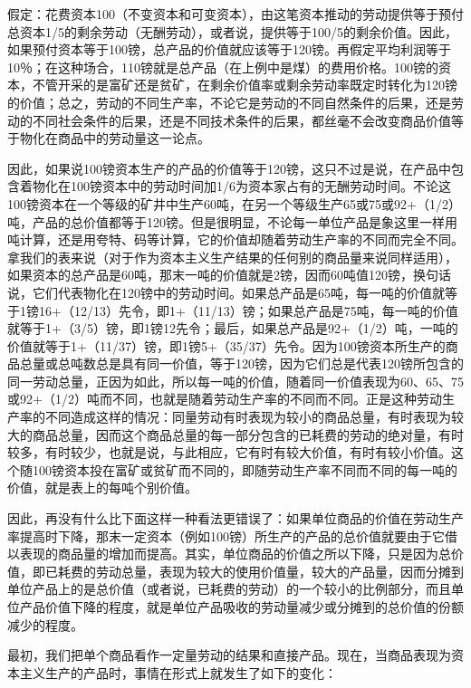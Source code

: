 
假定：花费资本100（不变资本和可变资本），由这笔资本推动的劳动提供等于预付总资本1/5的剩余劳动（无酬劳动），或者说，提供等于100/5的剩余价值。因此，如果预付资本等于100镑，总产品的价值就应该等于120镑。再假定平均利润等于10％；在这种场合，110镑就是总产品（在上例中是煤）的费用价格。100镑的资本，不管开采的是富矿还是贫矿，在剩余价值率或剩余劳动率既定时转化为120镑的价值；总之，劳动的不同生产率，不论它是劳动的不同自然条件的后果，还是劳动的不同社会条件的后果，还是不同技术条件的后果，都丝毫不会改变商品价值等于物化在商品中的劳动量这一论点。

因此，如果说100镑资本生产的产品的价值等于120镑，这只不过是说，在产品中包含着物化在100镑资本中的劳动时间加1/6为资本家占有的无酬劳动时间。不论这100镑资本在一个等级的矿井中生产60吨，在另一个等级生产65或75或92+（1/2）吨，产品的总价值都等于120镑。但是很明显，不论每一单位产品是象这里一样用吨计算，还是用夸特、码等计算，它的价值却随着劳动生产率的不同而完全不同。拿我们的表来说（对于作为资本主义生产结果的任何别的商品量来说同样适用），如果资本的总产品是60吨，那末一吨的价值就是2镑，因而60吨值120镑，换句话说，它们代表物化在120镑中的劳动时间。如果总产品是65吨，每一吨的价值就等于1镑16+（12/13）先令，即1+（11/13）镑；如果总产品是75吨，每一吨的价值就等于1+（3/5）镑，即1镑12先令；最后，如果总产品是92+（1/2）吨，一吨的价值就等于1+（11/37）镑，即1镑5+（35/37）先令。因为100镑资本所生产的商品总量或总吨数总是具有同一价值，等于120镑，因为它们总是代表120镑所包含的同一劳动总量，正因为如此，所以每一吨的价值，随着同一价值表现为60、65、75或92+（1/2）吨而不同，也就是随着劳动生产率的不同而不同。正是这种劳动生产率的不同造成这样的情况：同量劳动有时表现为较小的商品总量，有时表现为较大的商品总量，因而这个商品总量的每一部分包含的已耗费的劳动的绝对量，有时较多，有时较少，也就是说，与此相应，它有时有较大价值，有时有较小价值。这个随100镑资本投在富矿或贫矿而不同的，即随劳动生产率不同而不同的每一吨的价值，就是表上的每吨个别价值。

因此，再没有什么比下面这样一种看法更错误了：如果单位商品的价值在劳动生产率提高时下降，那末一定资本（例如100镑）所生产的产品的总价值就要由于它借以表现的商品量的增加而提高。其实，单位商品的价值之所以下降，只是因为总价值，即已耗费的劳动总量，表现为较大的使用价值量，较大的产品量，因而分摊到单位产品上的是总价值（或者说，已耗费的劳动）的一个较小的比例部分，而且单位产品价值下降的程度，就是单位产品吸收的劳动量减少或分摊到的总价值的份额减少的程度。

最初，我们把单个商品看作一定量劳动的结果和直接产品。现在，当商品表现为资本主义生产的产品时，事情在形式上就发生了如下的变化：

